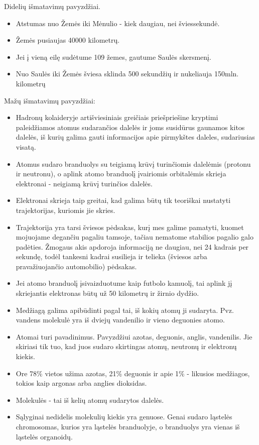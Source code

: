 \documentclass[a4paper]{article}
\begin{document}
\begin{enumerate}
Didelių išmatavimų pavyzdžiai.
\begin{itemize}
\item Atstumas nuo Žemės iki Mėnulio - kiek daugiau, nei šviessekundė. 
\item Žemės pusiaujas 40000 kilometrų. 
\item Jei į vieną eilę sudėtume 109 žemes, gautume Saulės skersmenį. 
\item Nuo Saulės iki Žemės šviesa sklinda 500 sekundžių ir nukeliauja 150mln. kilometrų
\end{itemize}
Mažų išmatavimų pavyzdžiai:
\begin{itemize}
\item Hadronų kolaideryje artišviesiniais greičiais priešpriešine kryptimi paleidžiamos atomus sudarančios dalelės ir joms susidūrus gaunamos kitos dalelės, iš kurių galima gauti informacijos apie pirmykštes daleles, sudariusias visatą.
\item Atomus sudaro branduolys su teigiamą krūvį turinčiomis dalelėmis (protonu ir neutronu), o aplink atomo branduolį įvairiomis orbitalėmis skrieja elektronai - neigiamą krūvį turinčios dalelės.
\item Elektronai skrieja taip greitai, kad galima būtų tik teoriškai nustatyti trajektorijas, kuriomis jie skries.  
\item Trajektorija yra tarsi šviesos pėdsakas, kurį mes galime pamatyti, kuomet mojuojame degančiu pagaliu tamsoje, tačiau nematome stabilios pagalio galo padėties. Žmogaus akis apdoroja informaciją ne daugiau, nei 24 kadrais per sekundę, todėl tankesni kadrai susilieja ir telieka (šviesos arba pravažiuojančio automobilio) pėdsakas.
\item Jei atomo branduolį įsivaizduotume kaip futbolo kamuolį, tai aplink jį skriejantis elektronas būtų už 50 kilometrų ir žirnio dydžio.
\item Medžiagą galima apibūdinti pagal tai, iš kokių atomų ji sudaryta. Pvz. vandens molekulė yra iš dviejų vandenilio ir vieno deguonies atomo.
\item Atomai turi pavadinimus. Pavyzdžiui azotas, deguonis, anglis, vandenilis. Jie skiriasi tik tuo, kad juos sudaro skirtingas atomų, neutronų ir elektronų kiekis.
\item Ore 78\% vietos užima azotas, 21\% deguonis ir apie 1\% - likusios medžiagos, tokios kaip argonas arba anglies dioksidas.
\item Molekulės - tai iš kelių atomų sudarytos dalelės. 
\item Sąlyginai nedidelis molekulių kiekis yra genuose. Genai sudaro ląstelės chromosomas, kurios yra ląstelės branduolyje, o branduolys yra vienas iš ląstelės organoidų.

\end{itemize}
\end{enumerate}
\end{document}
